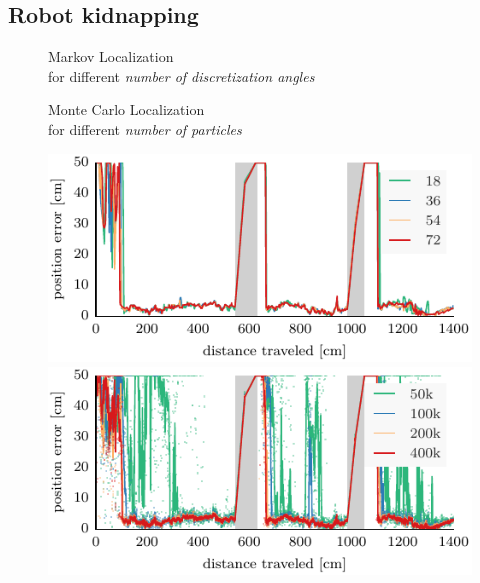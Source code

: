 \documentclass[letterpaper, 10pt, conference]{ieeeconf}
\begin{document}
\subsection{Robot kidnapping}

\begin{figure}

\begin{minipage}{3.4in}
\begin{center}
Markov Localization\\for different \emph{number of discretization angles}
\end{center}
\end{minipage}
\hfill
\begin{minipage}{3.4in}
\begin{center}
Monte Carlo Localization\\for different \emph{number of particles}
\end{center}
\end{minipage}

\vspace{.2em}

\includegraphics{ml-whole_random_long-xy} \hfill \includegraphics{mcl-whole_random_long-xy}

\vspace{.2em}


\end{figure}
\end{document}
